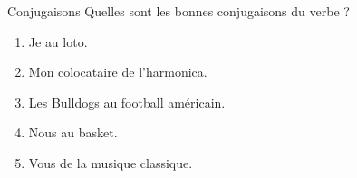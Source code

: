 \begin{frame}{Conjugaisons }
  Quelles sont les bonnes conjugaisons du verbe ? \\
  \begin{enumerate}
    \item Je \underline{} au loto.
    \item Mon colocataire \underline{} de l'harmonica.
    \item Les Bulldogs \underline{} au football américain.
    \item Nous \underline{} au basket.
    \item Vous \underline{} de la musique classique.
  \end{enumerate}
\end{frame}